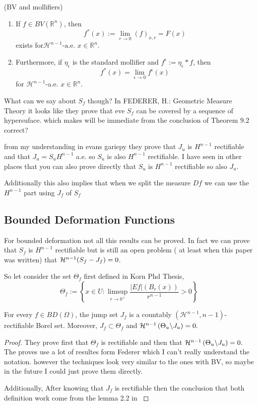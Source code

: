 \begin{theorem}(BV and mollifiers)
\begin{enumerate}
\item If $f \in B V\left(\mathbb{R}^n\right)$, then
$$f^*(x):=\lim _{r \rightarrow 0}(f)_{x, r}=F(x)$$
exists for$\mathcal{H}^{n-1} \text {-a.e. } x \in \mathbb{R}^n$.

\item Furthermore, if $\eta_\epsilon$ is the standard mollifier and $f^\epsilon:=\eta_\epsilon * f$, then
$$
f^*(x)=\lim _{\epsilon \rightarrow 0} f^\epsilon(x)
$$
for $\mathcal{H}^{n-1}$-a.e. $x \in \mathbb{R}^n$.
\end{enumerate}
\end{theorem}

\begin{question}
What can we say about $S_f$ though? In FEDERER, H.: Geometric Measure Theory it looks like they prove that eve $S_f$ can be covered by a sequence of hypersuface. which makes will be immediate from the conclusion of Theorem 9.2 correct?
\end{question}
\begin{com}
from my understanding  in evans gariepy they prove that $J_u$ is $H^{n-1}$ rectifiable and that $J_u=S_u H^{n-1}$ a.e. so $S_u$ is also $H^{n-1}$ rectifiable. I have seen in other places that you can also prove directly that $S_u$ is $H^{n-1}$ rectifiable so also $J_u$.

Additionally this also implies that when we split the measure $Df$ we can use the $H^{n-1}$ part using $J_f$ of $S_f$
\end{com}


\subsection{Bounded Deformation Functions}
For bounded deformation not all this results can be proved. In fact we can prove that $S_f$ is $H^{n-1}$ rectifiable but is still an open problem ( at least when this paper was written) that ${\mathcal H}^{n-1}(S_f-J_f)=0$.

So let consider the set $\Theta_f$ first defined in Korn Phd Thesis,
$$\Theta_f:=\left\{x \in U: \limsup _{r\rightarrow 0^{+}} \frac{|E f|\left(B_{r}(x)\right)}{r^{n-1}}>0\right\}$$
\begin{proposition}
For every $f \in B D(\Omega)$, the jump set $J_f$ is a countably $\left(\mathscr{H}^{n-1}, n-1\right)$-rectifiable Borel set. Moreover, $J_f\subset\Theta_f$ and ${\mathcal H}^{n-1}\left(\Theta_u \backslash J_u\right)=0.$ 
\end{proposition}
\begin{proof}
They prove first that $\Theta_f$ is rectifiable and then that ${\mathcal H}^{n-1}\left(\Theta_u \backslash J_u\right)=0.$ The proves use a lot of resultes form Federer which I can't really understand the notation. however the techniques look very similar to the ones with BV, so maybe in the future I could just prove them directly.

Additionally, After knowing that $J_f$ is rectifiable then the conclusion that both definition work come from the lemma 2.2 in \cite{RogerBook}
\end{proof}


